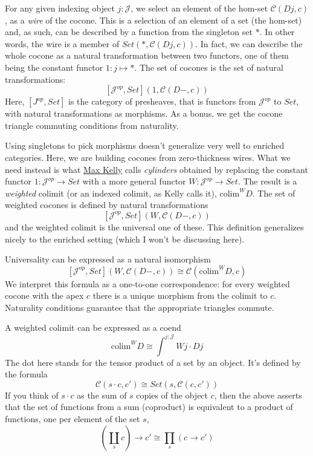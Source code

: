 \documentclass[11pt]{amsart}
\begin{document}
\begin{figure}[H]
\end{figure}
For any given indexing object $j \colon \mathcal{J}$, we select an element of the hom-set $\mathcal{C}(D j, c)$, as a \emph{wire} of the cocone. This is a selection of an element of a set (the hom-set) and, as such, can be described by a function from the singleton set $*$. In other words, the wire is a member of $Set(*, \mathcal{C}(D j, c))$. In fact, we can describe the whole cocone as a natural transformation between two functors, one of them being the constant functor $1 \colon j \mapsto *$. The set of cocones is the set of natural transformations:
\[ [\mathcal{J}^{op}, Set](1, \mathcal{C}(D -, c))\]
Here, $[J^{op}, Set]$ is the category of presheaves, that is functors from $\mathcal{J}^{op}$ to $Set$, with natural transformations as morphisms. As a bonus, we get the cocone triangle commuting conditions from naturality. 

Using singletons to pick morphisms doesn't generalize very well to enriched categories. Here, we are building cocones from zero-thickness wires. What we need instead is what \href{http://www.tac.mta.ca/tac/reprints/articles/10/tr10.pdf}{Max Kelly} calls \emph{cylinders} obtained by replacing the constant functor $1\colon \mathcal{J}^{op} \to Set$ with a more general functor $W \colon \mathcal{J}^{op} \to Set$. The result is a \emph{weighted} colimit (or an indexed colimit, as Kelly calls it), $\mbox{colim}^W D$. The set of weighted cocones is defined by natural transformations
\[ [\mathcal{J}^{op}, Set](W, \mathcal{C}(D -, c))\]
and the weighted colimit is the universal one of these. This definition generalizes nicely to the enriched setting (which I won't be discussing here). 

Universality can be expressed as a natural isomorphism
\[[\mathcal{J}^{op}, Set](W, \mathcal{C}(D -, c))  \cong  \mathcal{C}(\mbox{colim}^W D, c)\]
We interpret this formula as a one-to-one correspondence: for every weighted cocone with the apex $c$ there is a unique morphism from the colimit to $c$. Naturality conditions guarantee that the appropriate triangles commute.

A weighted colimit can be expressed as a coend
\[\mbox{colim}^W D \cong \int^{j \colon \mathcal{J}} W j \cdot D j\]
The dot here stands for the tensor product of a set by an object. It's defined by the formula
\[\mathcal{C}(s \cdot c, c') \cong Set(s, \mathcal{C}(c, c'))\]
If you think of $s \cdot c$ as the sum of $s$ copies of the object $c$, then the above asserts that the set of functions from a sum (coproduct) is equivalent to a product of functions, one per element of the set $s$,
\[(\coprod_s c) \to c' \cong \prod_s (c \to c')\]
 
\end{document}

